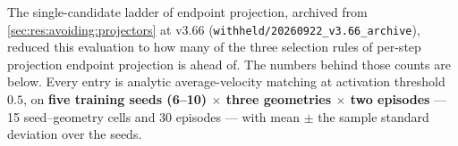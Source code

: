 The single-candidate ladder of endpoint projection, archived from \autoref{sec:res:avoiding:projectors} at v3.66 (\texttt{withheld/20260922\_v3.66\_archive}), reduced this evaluation to how many of the three selection rules of per-step
projection endpoint projection is ahead of. The numbers behind those counts are below. Every entry is
analytic average-velocity matching at activation threshold $0.5$, on \textbf{five training seeds (6--10)
$\times$ three geometries $\times$ two episodes} --- 15 seed--geometry cells and 30 episodes --- with
mean $\pm$ the sample standard deviation over the seeds.

